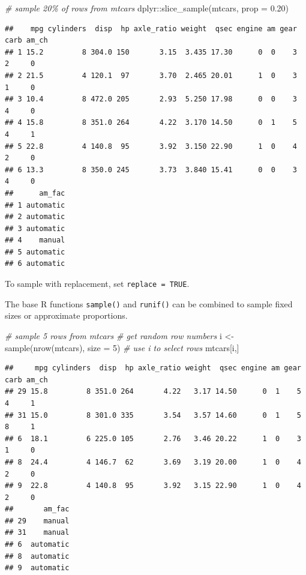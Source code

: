 \documentclass[
]{book}
\newenvironment{Shaded}{\begin{snugshade}}{\end{snugshade}}
\newcommand{\AttributeTok}[1]{\textcolor[rgb]{0.77,0.63,0.00}{#1}}
\newcommand{\CommentTok}[1]{\textcolor[rgb]{0.56,0.35,0.01}{\textit{#1}}}
\newcommand{\DecValTok}[1]{\textcolor[rgb]{0.00,0.00,0.81}{#1}}
\newcommand{\FloatTok}[1]{\textcolor[rgb]{0.00,0.00,0.81}{#1}}
\newcommand{\FunctionTok}[1]{\textcolor[rgb]{0.00,0.00,0.00}{#1}}
\newcommand{\NormalTok}[1]{#1}
\newcommand{\OtherTok}[1]{\textcolor[rgb]{0.56,0.35,0.01}{#1}}
\newcommand{\SpecialCharTok}[1]{\textcolor[rgb]{0.00,0.00,0.00}{#1}}
\begin{document}
\begin{Shaded}
\begin{Highlighting}[]
\CommentTok{\# sample 20\% of rows from mtcars}
\NormalTok{dplyr}\SpecialCharTok{::}\FunctionTok{slice\_sample}\NormalTok{(mtcars, }\AttributeTok{prop =} \FloatTok{0.20}\NormalTok{)}
\end{Highlighting}
\end{Shaded}

\begin{verbatim}
##    mpg cylinders  disp  hp axle_ratio weight  qsec engine am gear carb am_ch
## 1 15.2         8 304.0 150       3.15  3.435 17.30      0  0    3    2     0
## 2 21.5         4 120.1  97       3.70  2.465 20.01      1  0    3    1     0
## 3 10.4         8 472.0 205       2.93  5.250 17.98      0  0    3    4     0
## 4 15.8         8 351.0 264       4.22  3.170 14.50      0  1    5    4     1
## 5 22.8         4 140.8  95       3.92  3.150 22.90      1  0    4    2     0
## 6 13.3         8 350.0 245       3.73  3.840 15.41      0  0    3    4     0
##      am_fac
## 1 automatic
## 2 automatic
## 3 automatic
## 4    manual
## 5 automatic
## 6 automatic
\end{verbatim}

To sample with replacement, set \texttt{replace\ =\ TRUE}.

The base R functions \texttt{sample()} and \texttt{runif()} can be combined to sample fixed sizes or approximate proportions.

\begin{Shaded}
\begin{Highlighting}[]
\CommentTok{\# sample 5 rows from mtcars}
\CommentTok{\# get random row numbers}
\NormalTok{i }\OtherTok{\textless{}{-}} \FunctionTok{sample}\NormalTok{(}\FunctionTok{nrow}\NormalTok{(mtcars), }\AttributeTok{size =} \DecValTok{5}\NormalTok{)}
\CommentTok{\# use i to select rows}
\NormalTok{mtcars[i,]}
\end{Highlighting}
\end{Shaded}

\begin{verbatim}
##     mpg cylinders  disp  hp axle_ratio weight  qsec engine am gear carb am_ch
## 29 15.8         8 351.0 264       4.22   3.17 14.50      0  1    5    4     1
## 31 15.0         8 301.0 335       3.54   3.57 14.60      0  1    5    8     1
## 6  18.1         6 225.0 105       2.76   3.46 20.22      1  0    3    1     0
## 8  24.4         4 146.7  62       3.69   3.19 20.00      1  0    4    2     0
## 9  22.8         4 140.8  95       3.92   3.15 22.90      1  0    4    2     0
##       am_fac
## 29    manual
## 31    manual
## 6  automatic
## 8  automatic
## 9  automatic
\end{verbatim}
\end{document}
